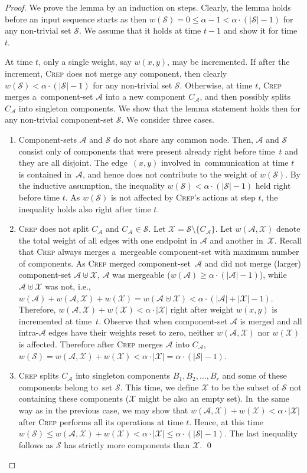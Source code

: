\documentclass{siamart190516}
\newcommand{\CREP}{\textsc{Crep}\xspace}
\newcommand{\set}{\mathcal{S}}
\newcommand{\A}{\mathcal{A}}
\newcommand{\X}{\mathcal{X}}
\begin{document}
\begin{proof}
We prove the lemma by an induction on steps. Clearly, the lemma holds before an
input sequence starts as then $w(\set) = 0 \leq \alpha - 1 < \alpha \cdot
(|\set|-1)$ for any non-trivial set $\set$. We assume that it holds at time $t-1$
and show it for time $t$.

At time $t$, only a single weight, say $w(x,y)$, may be incremented. If after
the increment, \CREP does not merge any component, then clearly $w(\set) < \alpha
\cdot (|\set|-1)$ for any non-trivial set $\set$. Otherwise, at time $t$, \CREP
merges a~component-set $\A$ into a new component $C_\A$, and then possibly
splits $C_\A$ into singleton components. We show that
the lemma statement holds then for any non-trivial component-set $\set$. We
consider three cases.

\begin{enumerate}

\item Component-sets $\A$ and $\set$ do not share any common node. Then, $\A$ and
$\set$ consist only of components that were present already right before time~$t$
and they are all disjoint. The edge~$(x,y)$ involved in~communication at time
$t$ is contained in~$\A$, and hence does not contribute to the weight of
$w(\set)$. By the inductive assumption, the inequality 
$w(\set) < \alpha \cdot (|\set|-1)$ held right
before time $t$. As $w(\set)$ is not affected by \CREP's actions at step $t$, the
inequality holds also right after time $t$.

\item \CREP does not split $C_\A$ and $C_\A \in \set$. Let $\X = \set \setminus
\{C_\A\}$. Let $w(\A,\X)$ denote the total weight of all edges with one endpoint
in $\A$ and another in~$\X$. Recall that
\CREP always merges a~mergeable component-set with maximum number of components. 
As \CREP merged component-set~$\A$ and did not merge
(larger) component-set $\A \uplus \X$, $\A$ was mergeable ($w(\A) \geq \alpha \cdot
(|\A|-1)$), while $\A \uplus \X$ was not, i.e., $w(\A) + w(\A,\X) + w(\X) = w(\A
\uplus \X) < \alpha \cdot (|\A|+|\X|-1)$. Therefore, $w(\A,\X) + w(\X) < \alpha
\cdot |\X|$ right after weight $w(x,y)$ is incremented at time~$t$. Observe
that when component-set $\A$ is merged and all intra-$\A$ edges have their weights 
reset to zero, neither $w(\A,\X)$ nor $w(\X)$ is affected.
Therefore after \CREP merges $\A$ into $C_\A$, $w(\set) =
w(\A,\X) + w(\X) < \alpha \cdot |\X| = \alpha \cdot (|\set| - 1)$.

\item \CREP splits $C_\A$ into singleton components $B_1, B_2, \ldots, B_r$ 
and some of these components belong to~set $\set$. This time, we define $\X$ to be
the subset of $\set$ not containing these components ($\X$ might be also an empty set). In~the
same way as in the previous case, we may show that $w(\A,\X) + w(\X) < \alpha
\cdot |\X|$ after \CREP performs all its operations at time $t$. Hence, at this
time $w(\set) \leq w(\A,\X) + w(\X) < \alpha \cdot |\X| \leq \alpha \cdot (|\set|-1)$.
The last inequality follows as $\set$ has strictly more components than $\X$.
\qed
\end{enumerate}
\end{proof}
\end{document}
